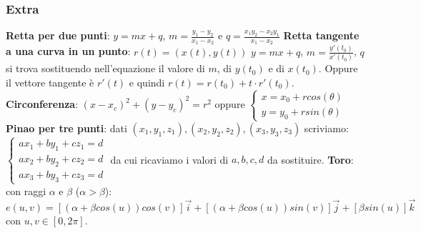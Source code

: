 \documentclass[fontsize=8pt]{scrartcl}
\begin{document}
\begin{multicols*}{4}
\subsubsection*{Extra}
\textbf{Retta per due punti}: \newline
$y = mx + q$, $m = \frac{y_1-y_2}{x_1-x_2}$ e $q = \frac{x_1y_2 - x_2 y_1}{x_1-x_2}$\newline
\textbf{Retta tangente a una curva in un punto}:\newline
$r(t) = (x(t),y(t))$\newline
$y= mx + q$, $m = \frac{y'(t_0)}{x'(t_0)}$, $q$ si trova sostituendo nell'equazione il valore di $m$, di $y(t_0)$ e di $x(t_0)$.\newline
Oppure il vettore tangente è $r'(t)$ e quindi $r(t) = r(t_0) + t \cdot r'(t_0)$.\newline
\textbf{Circonferenza}:\newline
$(x-x_c)^2 + (y-y_c)^2 = r^2$ oppure \newline
$\begin{cases}
    x= x_0 + r cos(\theta)\\ y= y_0 + r sin(\theta)
\end{cases}$\newline
\textbf{Pinao per tre punti}:\newline
dati $(x_1, y_1, z_1), (x_2,y_2,z_2), (x_3,y_3,z_3)$ scriviamo:\newline
$\begin{cases}
    a x_1 + by_1 + c z_1 = d\\ 
    a x_2 + by_2 + c z_2 = d\\ 
    a x_3 + by_3 + c z_3 = d
\end{cases}$ da cui ricaviamo i valori di $a,b,c,d$ da sostituire.\newline
\textbf{Toro}:\newline
con raggi $\alpha$ e $\beta$ ($\alpha> \beta$):\newline
$e(u,v) = [(\alpha + \beta cos(u)) cos(v)]\vec{i} + [(\alpha + \beta cos(u))sin(v)]\vec{j} + [\beta sin(u)]\vec{k}$ con $u, v \in [0,2\pi]$.

\end{multicols*}
\end{document}
